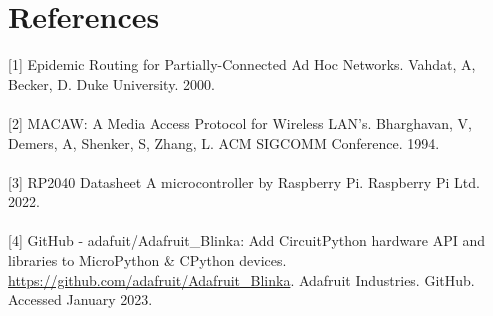 \documentclass[10pt, a4paper]{article}
\begin{document}
\section*{References}
\label{epidemic}[1] Epidemic Routing for Partially-Connected Ad Hoc Networks. Vahdat, A, Becker, D. Duke University. 2000. \\ \\ 
\label{macaw}[2] MACAW: A Media Access Protocol for Wireless LAN's. Bharghavan, V, Demers, A, Shenker, S, Zhang, L. ACM SIGCOMM Conference. 1994. \\ \\ 
\label{pico}[3] RP2040 Datasheet A microcontroller by Raspberry Pi. Raspberry Pi Ltd. 2022. \\ \\ 
\label{blinka}[4] GitHub - adafuit/Adafruit\_Blinka: Add CircuitPython hardware API and libraries to MicroPython \& CPython devices. \url{https://github.com/adafruit/Adafruit_Blinka}. Adafruit Industries. GitHub. Accessed January 2023. 
\end{document}
